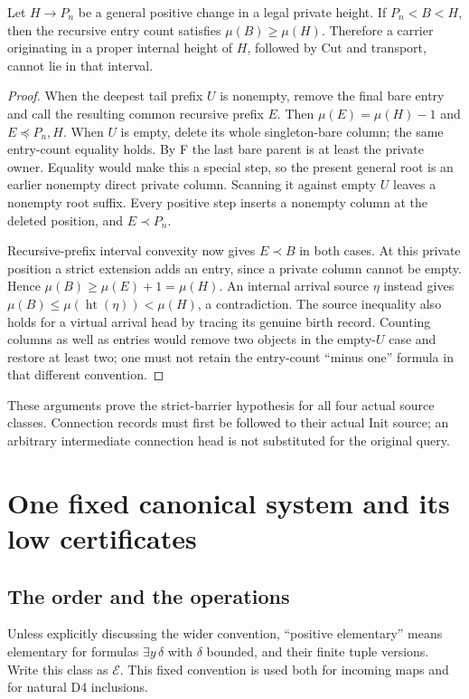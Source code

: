 \begin{lemma}\label{lem:empty-prefix}
Let $H\to P_n$ be a general positive change in a legal private height.
If $P_n<B<H$, then the recursive entry count satisfies
$\mu(B)\ge\mu(H)$. Therefore a carrier originating in a proper internal
height of $H$, followed by Cut and transport, cannot lie in that interval.
\end{lemma}
\begin{proof}
When the deepest tail prefix $U$ is nonempty, remove the final bare
entry and call the resulting common recursive prefix $E$. Then
$\mu(E)=\mu(H)-1$ and $E\preceq P_n,H$. When $U$ is empty, delete its
whole singleton-bare column; the same entry-count equality holds.
By F the last bare parent is at least the private owner. Equality
would make this a special step, so the present general root is an
earlier nonempty direct private column. Scanning it against empty
$U$ leaves a nonempty root suffix. Every positive step inserts a
nonempty column at the deleted position, and $E\prec P_n$.

Recursive-prefix interval convexity now gives $E\prec B$ in both
cases. At this private position a strict extension adds an entry,
since a private column cannot be empty. Hence
$\mu(B)\ge\mu(E)+1=\mu(H)$. An internal arrival source $\eta$ instead
gives $\mu(B)\le\mu(\operatorname{ht}(\eta))<\mu(H)$, a contradiction.
The source inequality also holds for a virtual arrival head by tracing
its genuine birth record. Counting columns as well as entries would
remove two objects in the empty-$U$ case and restore at least two;
one must not retain the entry-count ``minus one'' formula in that
different convention. 
\end{proof}

These arguments prove the strict-barrier hypothesis for all four
actual source classes. Connection records must first be followed to
their actual Init source; an arbitrary intermediate connection head
is not substituted for the original query.

\section{One fixed canonical system and its low certificates}\label{ch:canonical}

\subsection{The order and the operations}
Unless explicitly discussing the wider convention, ``positive
elementary'' means elementary for formulas $\exists y\,\delta$ with
$\delta$ bounded, and their finite tuple versions. Write this class as
$\mathcal E$. This fixed convention is used both for incoming maps
and for natural D4 inclusions.

